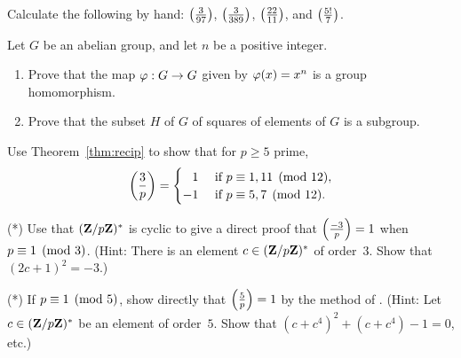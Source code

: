 \begin{exercises}
\item\label{ex:rec1} Calculate the following by hand:
  $\left(\frac{3}{97}\right)$, $\left(\frac{3}{389}\right)$, $\left(\frac{22}{11}\right)$, and $\left(\frac{5!}{7}\right)$.

\item \label{ex:powering} Let $G$ be an abelian group,
and let $n$ be a positive integer.
\begin{enumerate}
\item Prove that the
map $\varphi:G\to G$ given by $\varphi(x) = x^n$ is a group
homomorphism.
\item Prove that the subset $H$ of $G$ of squares
of elements of $G$ is a subgroup.
\end{enumerate}

\item\label{ex:rec2} Use Theorem~\ref{thm:recip}
to show that for $p\geq 5$ prime,
  $$ \kr{3}{p} = \begin{cases} \hfill 1 & \text{ if }p\con 1, 11\pmod{12},\\
    -1 & \text{ if }p\con 5, 7\pmod{12}.  \end{cases}$$

\item\label{ex:rec5}(*) Use that $(\mathbf{Z}/p\mathbf{Z}{})^*$ is cyclic to give a
  direct proof that $\left(\frac{-3}{p}\right)=1$ when $p\equiv 1\pmod{3}$. (Hint:
  There is an element $c\in (\mathbf{Z}/p\mathbf{Z}{})^*$ of order~$3$.  Show that
  $(2c+1)^2=-3$.)


\item\label{ex:rec6}(*) If $p\equiv 1\pmod{5}$, show directly that
  $\left(\frac{5}{p}\right)=1$ by the method of .
  (Hint: Let $c\in(\mathbf{Z}/p\mathbf{Z}{})^*$ be an element of order~$5$.  Show that
  $(c+c^4)^2+(c+c^4)-1=0$, etc.)



\end{exercises}
